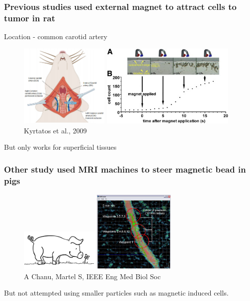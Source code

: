 \documentclass[8pt,xcolor=table]{beamer}
\begin{document}
\begin{frame}
\frametitle{Previous studies used external magnet to attract cells to tumor in rat}


Location - common carotid artery

\begin{figure}
\centering
\includegraphics[height=4cm]{rat_cca} \includegraphics[height=4cm]{external_magnet}\\
Kyrtatos  et al., 2009
\end{figure}

\vfill

But only works for superficial tissues
 
\end{frame}

\begin{frame}
\frametitle{Other study used MRI machines to steer magnetic bead in pigs}

\begin{figure}
\centering
\includegraphics[height=2cm]{pig_outline} \includegraphics[height=4cm]{pig_tube}\\
A Chanu, Martel S, IEEE Eng Med Biol Soc
\end{figure}

\vfill

But not attempted using smaller particles such as magnetic induced cells.
 
\end{frame}
\end{document}
